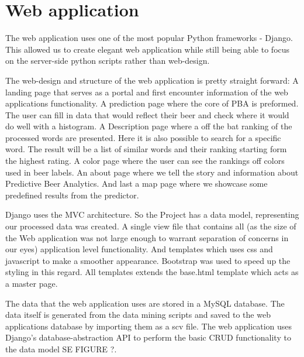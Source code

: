 \documentclass[10pt]{IEEEtran}
\begin{document}
\section{Web application}

The web application uses one of the most popular Python frameworks - Django. This allowed us to create elegant web application while still being able to focus on the server-side python scripts rather than web-design.

The web-design and structure of the web application is pretty straight forward:
A landing page that serves as a portal and first encounter information of the web applications functionality.
A prediction page where the core of PBA is preformed.
The user can fill in data that would reflect their beer and check where it would do well with a histogram.
A Description page where a off the bat ranking of the processed words are presented.
Here it is also possible to search for a specific word.
The result will be a list of similar words and their ranking starting form the highest rating.
A color page where the user can see the rankings off colors used in beer labels.
An about page where we tell the story and information about Predictive Beer Analytics.
And last a map page where we showcase some predefined results from the predictor.

Django uses the MVC architecture. So the Project has a data model, representing our processed data was created.
A single view file that contains all (as the size of the Web application was not large enough to warrant separation of concerns in our eyes) application level functionality. And templates which uses css and javascript to make a smoother appearance.
Bootstrap was used to speed up the styling in this regard. All templates extends the base.html template which
acts as a master page.

The data that the web application uses are stored in a MySQL database.
The data itself is generated from the data mining scripts and saved to the web applications database by importing them as a scv file.
The web application uses Django's database-abstraction API to perform the basic CRUD functionality to the data model SE FIGURE ?.
 
\end{document}
